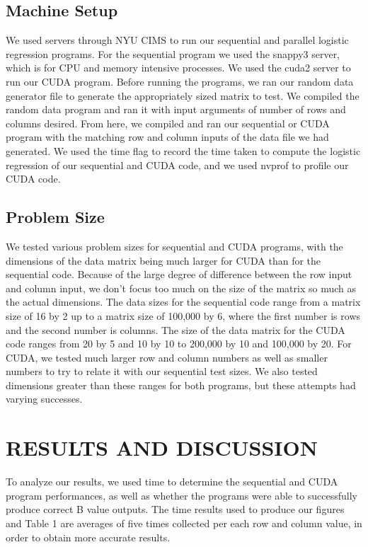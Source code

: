 \documentclass[letterpaper, 10 pt, conference]{ieeeconf}  %
\begin{document}
\subsection{Machine Setup} 

We used servers through NYU CIMS to run our sequential and parallel logistic regression programs. For the sequential program we used the snappy3 server, which is for CPU and memory intensive processes. We used the cuda2 server to run our CUDA program. Before running the programs, we ran our random data generator file to generate the appropriately sized matrix to test. We compiled the random data program and ran it with input arguments of number of rows and columns desired. From here, we compiled and ran our sequential or CUDA program with the matching row and column inputs of the data file we had generated. We used the time flag to record the time taken to compute the logistic regression of our sequential and CUDA code, and we used nvprof to profile our CUDA code. 

\subsection{Problem Size} 
We tested various problem sizes for sequential and CUDA programs, with the dimensions of the data matrix being much larger for CUDA than for the sequential code.  Because of the large degree of difference between the row input and column input, we don't focus too much on the size of the matrix so much as the actual dimensions. The data sizes for the sequential code range from a matrix size of 16 by 2 up to a matrix size of 100,000 by 6, where the first number is rows and the second number is columns. The size of the data matrix for the CUDA code ranges from 20 by 5 and 10 by 10 to 200,000 by 10 and 100,000 by 20. For CUDA, we tested much larger row and column numbers as well as smaller numbers to try to relate it with our sequential test sizes. We also tested dimensions greater than these ranges for both programs, but these attempts had varying successes.




\section{RESULTS AND DISCUSSION}

To analyze our results, we used time to determine the sequential and CUDA program performances, as well as whether the programs were able to successfully produce correct B value outputs. The time results used to produce our figures and Table 1 are averages of five times collected per each row and column value, in order to obtain more accurate results.
\end{document}
